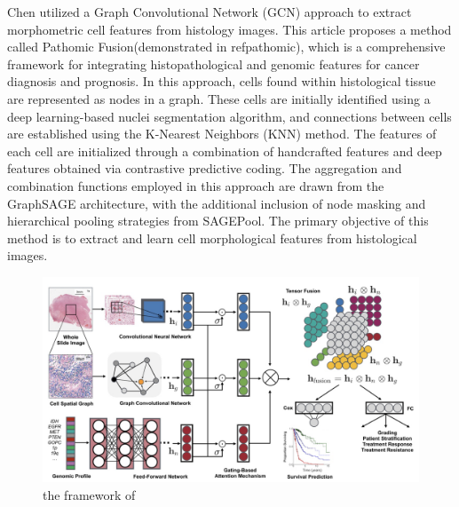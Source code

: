 \documentclass[journal,twoside,web]{ieeecolor}
\begin{document}
Chen\cite{chen2020pathomic} utilized a Graph Convolutional Network (GCN) approach to extract morphometric cell features from histology images. This article proposes a method called Pathomic Fusion(demonstrated in ref{pathomic}), which is a comprehensive framework for integrating histopathological and genomic features for cancer diagnosis and prognosis. In this approach, cells found within histological tissue are represented as nodes in a graph. These cells are initially identified using a deep learning-based nuclei segmentation algorithm, and connections between cells are established using the K-Nearest Neighbors (KNN) method. The features of each cell are initialized through a combination of handcrafted features and deep features obtained via contrastive predictive coding. The aggregation and combination functions employed in this approach are drawn from the GraphSAGE architecture, with the additional inclusion of node masking and hierarchical pooling strategies from SAGEPool. The primary objective of this method is to extract and learn cell morphological features from histological images.
\begin{figure}
    \centering
    \includegraphics[width=0.8\linewidth]{img/pathomic.png}
    \caption{the framework of \cite{chen2020pathomic}}
    \label{pathomic}
\end{figure}
\end{document}
